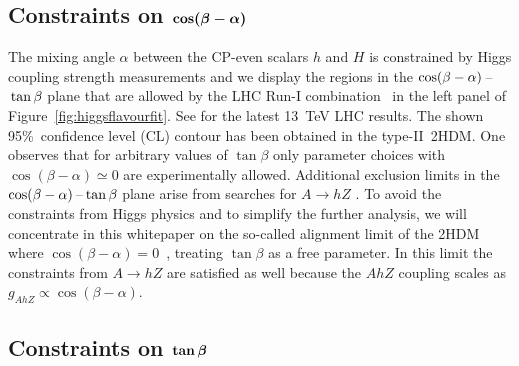 \documentclass[a4paper, 11pt,notoc]{article}
\def\bm#1{\mbox{\boldmath$#1$\unboldmath}}
\begin{document}
\subsection*{Constraints on $\bm{\cos (\beta - \alpha)}$}

The mixing angle $\alpha$ between the CP-even scalars $h$ and $H$ is constrained by Higgs coupling strength measurements and we display the regions in the $\cos(\beta-\alpha)\hspace{0.5mm}$--$\hspace{0.5mm}\tan\beta$ plane that are allowed by the LHC Run-I combination~\cite{Khachatryan:2016vau} in  the left panel of Figure~\ref{fig:higgsflavourfit}. See \cite{ATLAS-CONF-2018-031,CMS-PAS-HIG-17-031} for the latest 13~TeV LHC results.  The shown 95\%~confidence level (CL) contour has been obtained in the type-II~2HDM. One observes that for arbitrary values of $\tan \beta$ only parameter choices with $\cos(\beta-\alpha) \simeq 0$ are experimentally allowed.  Additional exclusion limits in the $\cos(\beta-\alpha)\hspace{0.5mm}$--$\hspace{0.5mm}\tan\beta$ plane arise from searches for $A \to hZ$ \cite{Aaboud:2017cxo,CMS-PAS-HIG-18-005}. To avoid the constraints from Higgs physics and to simplify the further analysis, we will concentrate in this whitepaper on the so-called alignment limit of the 2HDM where $\cos (\beta - \alpha) = 0$~\cite{Gunion:2002zf}, treating $\tan \beta$ as a free parameter. In this limit the constraints from $A \to hZ$ are satisfied as well because the $AhZ$ coupling scales as $g_{AhZ} \propto \cos (\beta - \alpha)$. 

\subsection*{Constraints on $\bm{\tan \beta}$}
\end{document}
